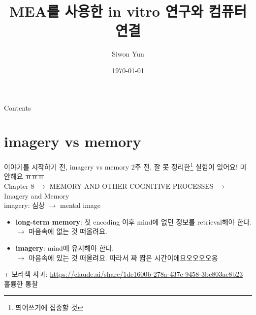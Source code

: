 \documentclass{beamer}
\title{MEA를 사용한 in vitro 연구와 컴퓨터 연결}
\author{Siwon Yun}
\institute{BCSC 2025}
\date{\today}
\begin{document}
\begin{frame}
    \titlepage
\end{frame}

\begin{frame}{Contents}
  \tableofcontents
\end{frame}

\section{imagery vs memory}
\begin{frame}{이야기를 시작하기 전, imagery vs memory}
  2주 전, 잘 못 정리한\footnote{띄어쓰기에 집중할 것} 실험이 있어요! 미안해요 ㅠㅠㅠ\\
  Chapter 8 $\rightarrow$ MEMORY AND OTHER COGNITIVE PROCESSES $\rightarrow$ Imagery and Memory\\
  imagery: 심상 $\rightarrow$ mental image\\

  \begin{itemize}
    \item \textbf{long-term memory}: 첫 encoding 이후 mind에 없던 정보를 retrieval해야 한다.\\
      $\longrightarrow$ 마음속에 없는 것 떠올려요.
    \item \textbf{imagery}: mind에 유지해야 한다.\\
      $\longrightarrow$ 마음속에 있는 것 떠올려요. 따라서 짜 짧은 시간이에요오오오오옹
  \end{itemize}

  + 보라색 사과: \url{https://claude.ai/share/1de1600b-278a-437e-9458-3be803ae8b23}\\
  훌륭한 통찰 \faThumbsOUp
\end{frame}
\end{document}
